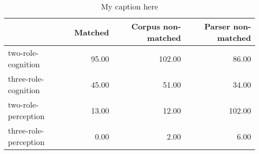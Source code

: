 \begin{table}[!ht]
\centering
\begin{tabular}{lrrr}
\toprule
{} &  Matched &  Corpus non-matched &  Parser non-matched \\
\midrule
two-role-cognition    &    95.00 &              102.00 &               86.00 \\
three-role-cognition  &    45.00 &               51.00 &               34.00 \\
two-role-perception   &    13.00 &               12.00 &              102.00 \\
three-role-perception &     0.00 &                2.00 &                6.00 \\
\bottomrule
\end{tabular}
\caption{My caption here}
\label{tab:MENTAL-oe-data}
\end{table}